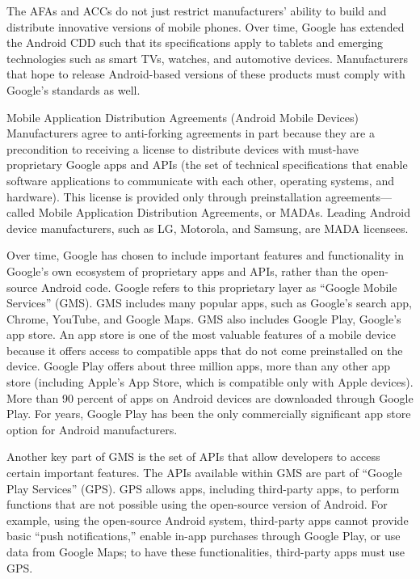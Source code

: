 \documentclass[11pt,b5paper]{scrartcl}
\begin{document}

The AFAs and ACCs do not just restrict manufacturers’ ability to build and
distribute innovative versions of mobile phones. Over time, Google has extended the Android
CDD such that its specifications apply to tablets and emerging technologies such as smart TVs,
watches, and automotive devices. Manufacturers that hope to release Android-based versions of
these products must comply with Google’s standards as well.




Mobile Application Distribution Agreements (Android Mobile Devices)
Manufacturers agree to anti-forking agreements in part because they are a
precondition to receiving a license to distribute devices with must-have proprietary Google apps
and APIs (the set of technical specifications that enable software applications to communicate
with each other, operating systems, and hardware). This license is provided only through
preinstallation agreements—called Mobile Application Distribution Agreements, or MADAs.
Leading Android device manufacturers, such as LG, Motorola, and Samsung, are MADA
licensees.


Over time, Google has chosen to include important features and functionality in
Google’s own ecosystem of proprietary apps and APIs, rather than the open-source Android
code. Google refers to this proprietary layer as “Google Mobile Services” (GMS). GMS includes
many popular apps, such as Google’s search app, Chrome, YouTube, and Google Maps. GMS
also includes Google Play, Google’s app store. An app store is one of the most valuable features
of a mobile device because it offers access to compatible apps that do not come preinstalled on
the device. Google Play offers about three million apps, more than any other app store (including
Apple’s App Store, which is compatible only with Apple devices). More than 90 percent of apps
on Android devices are downloaded through Google Play. For years, Google Play has been the
only commercially significant app store option for Android manufacturers.


Another key part of GMS is the set of APIs that allow developers to access certain
important features. The APIs available within GMS are part of “Google Play Services” (GPS).
GPS allows apps, including third-party apps, to perform functions that are not possible using the
open-source version of Android. For example, using the open-source Android system, third-party
apps cannot provide basic “push notifications,” enable in-app purchases through Google Play, or
use data from Google Maps; to have these functionalities, third-party apps must use GPS.
\end{document}
